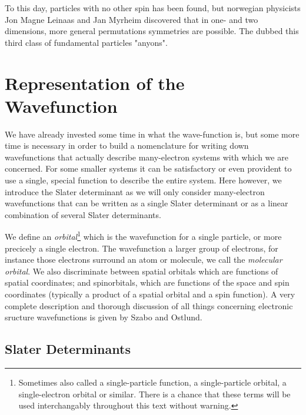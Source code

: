         To this day, particles with no other spin has been found, but norwegian physicists
        Jon Magne Leinaas and Jan Myrheim discovered that in one- and two dimensions, more 
        general permutations symmetries are possible. The dubbed this third class of
        fundamental particles "anyons"\cite{leinaas1977theory}.
        
    \section{Representation of the Wavefunction}

        We have already invested some time in what the wave-function is, but some more time 
        is necessary in order to build a nomenclature for writing down wavefunctions that
        actually describe many-electron systems with which we are concerned. For some smaller
        systems it can be satisfactory or even provident to use a single, special function 
        to describe the entire system. Here however, we introduce the Slater determinant as 
        we will only consider many-electron wavefunctions that can be written as a single 
        Slater determinant or as a linear combination of several Slater determinants.

        We define an \emph{orbital}\footnote{Sometimes also called a single-particle function,
        a single-particle orbital, a single-electron orbital or similar. There is a chance that 
        these terms will be used interchangably throughout this text without warning.} which is the
        wavefunction for a single particle, or more precicely a single electron. The wavefunction
        a larger group of electrons, for instance those electrons surround an atom or molecule,
        we call the \emph{molecular orbital}. We also discriminate between 
        spatial orbitals which are functions of spatial coordinates; and spinorbitals, which 
        are functions of the space and spin coordinates (typically a product of a spatial orbital
        and a spin function). A very complete description and thorough discussion of all things 
        concerning electronic sructure wavefunctions is given by Szabo and Ostlund\cite{szabo2012modern}. 

        \subsection{Slater Determinants}

